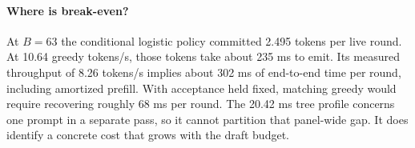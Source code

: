 \paragraph{Where is break-even?} At $B=63$ the conditional logistic policy committed 2.495 tokens per live round. At 10.64 greedy tokens/s, those tokens take about 235 ms to emit. Its measured throughput of 8.26 tokens/s implies about 302 ms of end-to-end time per round, including amortized prefill. With acceptance held fixed, matching greedy would require recovering roughly 68 ms per round. The 20.42 ms tree profile concerns one prompt in a separate pass, so it cannot partition that panel-wide gap. It does identify a concrete cost that grows with the draft budget.
